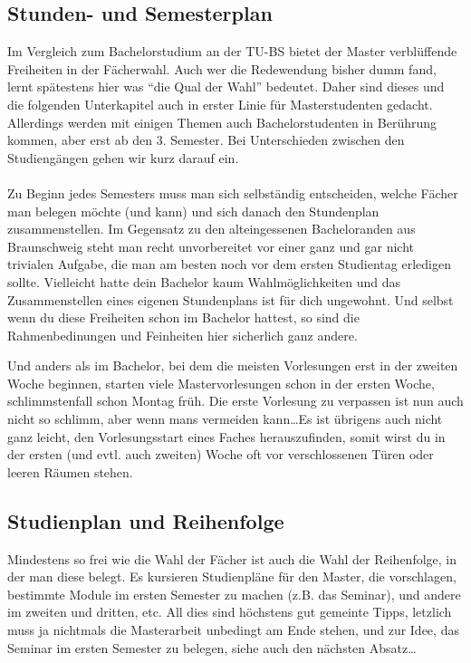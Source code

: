 
\subsection{Stunden- und Semesterplan}
 
Im Vergleich zum Bachelorstudium an der TU-BS bietet der Master
verblüffende Freiheiten in der Fächerwahl. Auch wer die Redewendung
bisher dumm fand, lernt spätestens hier was "`die Qual der Wahl"'
bedeutet. Daher sind dieses und die folgenden Unterkapitel auch in erster
Linie für Masterstudenten gedacht. Allerdings werden mit einigen
Themen auch Bachelorstudenten in Berührung kommen, aber erst ab den
3. Semester. Bei Unterschieden zwischen den Studiengängen gehen wir
kurz darauf ein.\\\\
Zu Beginn jedes Semesters muss man sich selbständig entscheiden, welche Fächer man belegen möchte (und kann) und sich danach den Stundenplan zusammenstellen. Im Gegensatz zu den alteingessenen Bacheloranden aus Braunschweig steht man recht unvorbereitet vor einer ganz und gar nicht trivialen Aufgabe, die man am besten noch vor dem ersten Studientag erledigen sollte. Vielleicht hatte dein Bachelor kaum Wahlmöglichkeiten und das Zusammenstellen eines eigenen Stundenplans ist für dich ungewohnt. Und selbst wenn du diese Freiheiten schon im Bachelor hattest, so sind die Rahmenbedinungen und Feinheiten hier sicherlich ganz andere.

Und anders als im Bachelor, bei dem die meisten Vorlesungen erst in der zweiten Woche beginnen, starten viele Mastervorlesungen schon in der ersten Woche, schlimmstenfall schon Montag früh. Die erste Vorlesung zu verpassen ist nun auch nicht so schlimm, aber wenn mans vermeiden kann\ldots Es ist übrigens auch nicht ganz leicht, den Vorlesungsstart eines Faches herauszufinden, somit wirst du in der ersten (und evtl. auch zweiten) Woche oft vor verschlossenen Türen oder leeren Räumen stehen.







\subsection{Studienplan und Reihenfolge}
Mindestens so frei wie die Wahl der Fächer ist auch die Wahl der Reihenfolge, in der man diese belegt. Es kursieren Studienpläne für den Master, die vorschlagen, bestimmte Module im ersten Semester zu machen (z.B. das Seminar), und andere im zweiten und dritten, etc. All dies sind höchstens gut gemeinte Tipps, letzlich muss ja nichtmals die Masterarbeit unbedingt am Ende stehen, und zur Idee, das Seminar im ersten Semester zu belegen, siehe auch den nächsten Absatz\ldots
          



